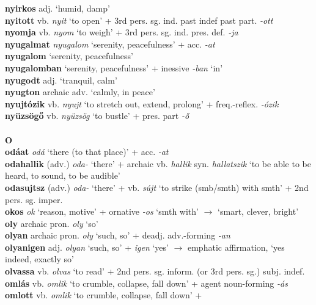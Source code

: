\documentclass[11pt]{article}
\begin{document}
\textbf{nyirkos} adj. `humid, damp' \\
\textbf{nyitott} vb. \emph{nyit} `to open' + 3rd pers. sg. ind. past
indef \textbar\textbar{} past part. \emph{-ott} \\
\textbf{nyomja} vb. \emph{nyom} `to weigh' + 3rd
pers. sg. ind. pres. def. \emph{-ja} \\
\textbf{nyugalmat} \emph{nyugalom} `serenity, peacefulness' +
acc. \emph{-at} \\
\textbf{nyugalom} `serenity, peacefulness' \\
\textbf{nyugalomban} `serenity, peacefulness' + inessive \emph{-ban}
`in' \\
\textbf{nyugodt} adj. `tranquil, calm'\\
\textbf{nyugton} archaic adv. `calmly, in peace' \\
\textbf{nyujtózik} vb. \emph{nyujt} `to stretch out, extend, prolong' + freq.\hyp{}reflex. \emph{-ózik} \\
\textbf{nyüzsögő} vb. \emph{nyüzsög} `to bustle' +
pres. part \emph{-ő} \\
\ \\
\noindent \textbf{\large O} \\
\textbf{odáat} \emph{odá} `there (to that place)' + acc. \emph{-at} \\
\textbf{odahallik} (adv.) \emph{oda-} `there' +
archaic vb. \emph{hallik} syn. \emph{hallatszik} `to be able to be
heard, to sound, to be audible' \\
\textbf{odasujtsz} (adv.) \emph{oda-} `there' +
vb. \emph{sújt} `to strike (smb/smth) with smth' + 2nd
pers. sg. imper. \\
\textbf{okos} \emph{ok} `reason, motive' + ornative \emph{-os} `smth
with' $\rightarrow$ `smart, clever, bright' \\
\textbf{oly} archaic pron. \emph{oly} `so' \\
\textbf{olyan} archaic pron. \emph{oly} `such, so' + deadj. adv.\hyp{}forming
\emph{-an} \\
\textbf{olyanigen} adj. \emph{olyan} `such, so' + \emph{igen} `yes'
$\rightarrow$ emphatic affirmation, `yes indeed, exactly so' \\
\textbf{olvassa} vb. \emph{olvas} `to read' + 2nd
pers. sg. inform. (or 3rd pers. sg.) subj. indef. \\
\textbf{omlás} vb. \emph{omlik} `to crumble, collapse, fall down' +
agent noun\hyp{}forming \emph{-ás} \\
\textbf{omlott} vb. \emph{omlik} `to crumble, collapse, fall down' +
\end{document}
